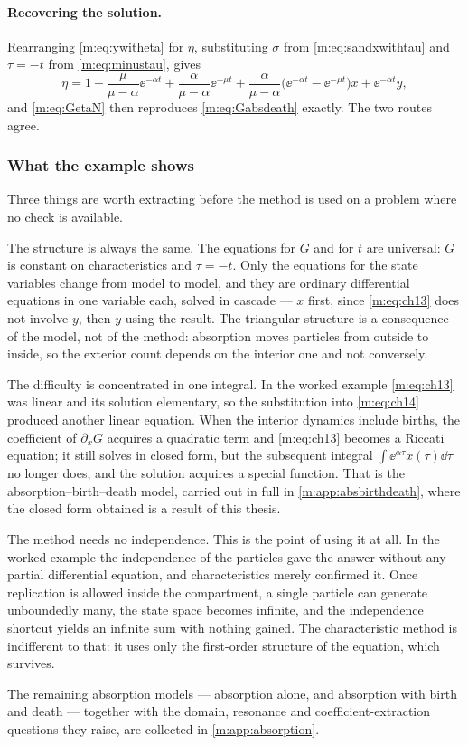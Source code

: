 \paragraph{Recovering the solution.}
Rearranging \cref{m:eq:ywitheta} for $\eta$, substituting $\sigma$ from
\cref{m:eq:sandxwithtau} and $\tau=-t$ from \cref{m:eq:minustau}, gives
\begin{equation*}
\eta = 1-\frac{\mu}{\mu-\alpha}\ee^{-\alpha t} + \frac{\alpha}{\mu-\alpha}\ee^{-\mu t}
+ \frac{\alpha}{\mu-\alpha}\bigl(\ee^{-\alpha t}-\ee^{-\mu t}\bigr)x
+ \ee^{-\alpha t}y ,
\end{equation*}
and \cref{m:eq:GetaN} then reproduces \cref{m:eq:Gabsdeath} exactly. The two routes
agree.

\subsubsection{What the example shows}
\label{m:sec:mocwhat}

Three things are worth extracting before the method is used on a problem where no
check is available.

The structure is always the same. The equations for $G$ and for $t$ are universal:
$G$ is constant on characteristics and $\tau=-t$. Only the equations for the state
variables change from model to model, and they are ordinary differential equations
in one variable each, solved in cascade --- $x$ first, since \cref{m:eq:ch13} does
not involve $y$, then $y$ using the result. The triangular structure is a
consequence of the model, not of the method: absorption moves particles from
outside to inside, so the exterior count depends on the interior one and not
conversely.

The difficulty is concentrated in one integral. In the worked example
\cref{m:eq:ch13} was linear and its solution elementary, so the substitution into
\cref{m:eq:ch14} produced another linear equation. When the interior dynamics
include births, the coefficient of $\partial_xG$ acquires a quadratic term and
\cref{m:eq:ch13} becomes a Riccati equation; it still solves in closed form, but the
subsequent integral $\int\ee^{\alpha\tau}x(\tau)\dd\tau$ no longer does, and the
solution acquires a special function. That is the absorption--birth--death model,
carried out in full in \cref{m:app:absbirthdeath}, where the closed form obtained is
a result of this thesis.

The method needs no independence. This is the point of using it at all. In the
worked example the independence of the particles gave the answer without any
partial differential equation, and characteristics merely confirmed it. Once
replication is allowed inside the compartment, a single particle can generate
unboundedly many, the state space becomes infinite, and the independence shortcut
yields an infinite sum with nothing gained. The characteristic method is
indifferent to that: it uses only the first-order structure of the equation, which
survives.

The remaining absorption models --- absorption alone, and absorption with birth and
death --- together with the domain, resonance and coefficient-extraction questions
they raise, are collected in \cref{m:app:absorption}.

\FloatBarrier
